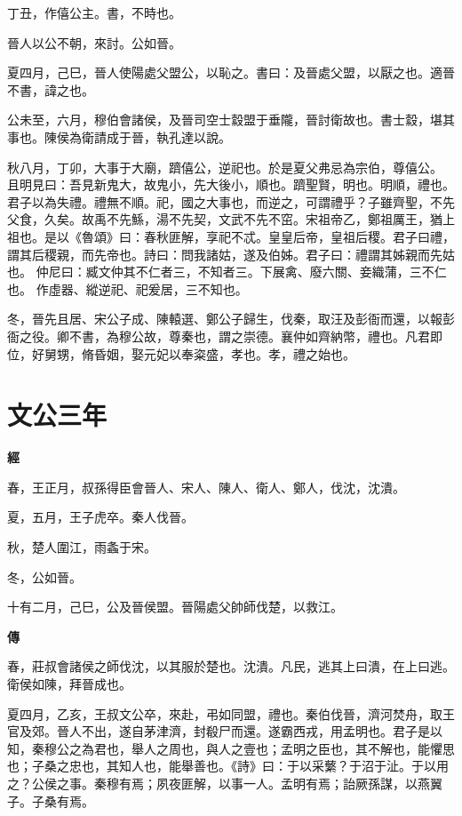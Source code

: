\documentclass{ctexart}
\begin{document}
丁丑，作僖公主。書，不時也。

晉人以公不朝，來討。公如晉。

夏四月，己巳，晉人使陽處父盟公，以恥之。書曰：及晉處父盟，以厭之也。適晉不書，諱之也。

公未至，六月，穆伯會諸侯，及晉司空士縠盟于垂隴，晉討衛故也。書士縠，堪其事也。陳侯為衛請成于晉，執孔達以說。

秋八月，丁卯，大事于大廟，躋僖公，逆祀也。於是夏父弗忌為宗伯，尊僖公。
且明見曰：吾見新鬼大，故鬼小，先大後小，順也。躋聖賢，明也。明順，禮也。君子以為失禮。禮無不順。祀，國之大事也，而逆之，可謂禮乎？子雖齊聖，不先父食，久矣。故禹不先鯀，湯不先契，文武不先不窋。宋祖帝乙，鄭祖厲王，猶上祖也。是以《魯頌》曰：春秋匪解，享祀不忒。皇皇后帝，皇祖后稷。君子曰禮，謂其后稷親，而先帝也。詩曰：問我諸姑，遂及伯姊。君子曰：禮謂其姊親而先姑也。
仲尼曰：臧文仲其不仁者三，不知者三。下展禽、廢六關、妾織蒲，三不仁也。
作虛器、縱逆祀、祀爰居，三不知也。

冬，晉先且居、宋公子成、陳轅選、鄭公子歸生，伐秦，取汪及彭衙而還，以報彭衙之役。卿不書，為穆公故，尊秦也，謂之崇德。襄仲如齊納幣，禮也。凡君即位，好舅甥，脩昏姻，娶元妃以奉粢盛，孝也。孝，禮之始也。





\section{文公三年}


\textbf{經}



春，王正月，叔孫得臣會晉人、宋人、陳人、衛人、鄭人，伐沈，沈潰。

夏，五月，王子虎卒。秦人伐晉。

秋，楚人圍江，雨螽于宋。

冬，公如晉。

十有二月，己巳，公及晉侯盟。晉陽處父帥師伐楚，以救江。

\textbf{傳}



春，莊叔會諸侯之師伐沈，以其服於楚也。沈潰。凡民，逃其上曰潰，在上曰逃。衛侯如陳，拜晉成也。

夏四月，乙亥，王叔文公卒，來赴，弔如同盟，禮也。秦伯伐晉，濟河焚舟，取王官及郊。晉人不出，遂自茅津濟，封殽尸而還。遂霸西戎，用孟明也。君子是以知，秦穆公之為君也，舉人之周也，與人之壹也；孟明之臣也，其不解也，能懼思也；子桑之忠也，其知人也，能舉善也。《詩》曰：于以采蘩？于沼于沚。于以用之？公侯之事。秦穆有焉；夙夜匪解，以事一人。孟明有焉；詒厥孫謀，以燕翼子。子桑有焉。
\end{document}
